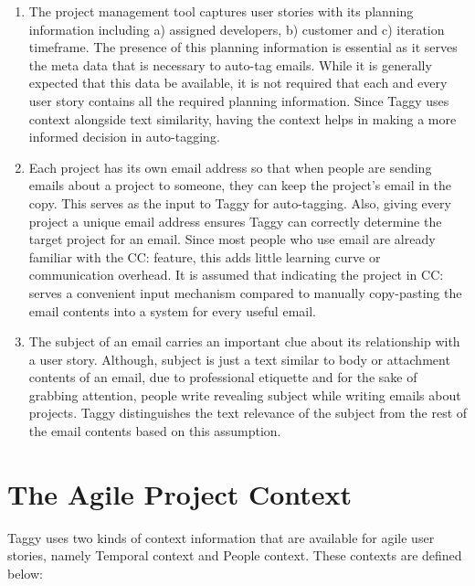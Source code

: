 \begin{enumerate}
	\item The project management tool captures user stories with its planning information including a) assigned developers, b) customer and c) iteration timeframe. The presence of this planning information is essential as it serves the meta data that is necessary to auto-tag emails. While it is generally expected that this data be available, it is not required that each and every user story contains all the required planning information. Since Taggy uses context alongside text similarity, having the context helps in making a more informed decision in auto-tagging.
	
	\item Each project has its own email address so that when people are sending emails about a project to someone, they can keep the project's email in the copy. This serves as the input to Taggy for auto-tagging. Also, giving every project a unique email address ensures Taggy can correctly determine the target project for an email. Since most people who use email are already familiar with the CC: feature, this adds little learning curve or communication overhead. It is assumed that indicating the project in CC: serves a convenient input mechanism compared to manually copy-pasting the email contents into a system for every useful email.		
	
	\item The subject of an email carries an important clue about its relationship with a user story. Although, subject is just a text similar to body or attachment contents of an email, due to professional etiquette and for the sake of grabbing attention, people write revealing subject while writing emails about projects. Taggy distinguishes the text relevance of the subject from the rest of the email contents based on this assumption.
\end{enumerate}



\section{The Agile Project Context}
Taggy uses two kinds of context information that are available for agile user stories, namely Temporal context and People context. These contexts are defined below:

